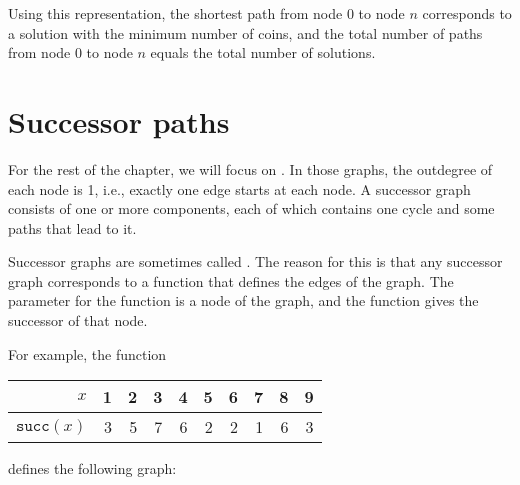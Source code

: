 Using this representation,
the shortest path from node 0 to node $n$
corresponds to a solution with the minimum number of coins,
and the total number of paths from node 0 to node $n$
equals the total number of solutions.

\section{Successor paths}


For the rest of the chapter,
we will focus on .
In those graphs,
the outdegree of each node is 1, i.e.,
exactly one edge starts at each node.
A successor graph consists of one or more
components, each of which contains
one cycle and some paths that lead to it.

Successor graphs are sometimes called
.
The reason for this is that any successor graph
corresponds to a function that defines
the edges of the graph.
The parameter for the function is a node of the graph,
and the function gives the successor of that node.

For example, the function
\begin{center}
\begin{tabular}{r|rrrrrrrrr}
$x$ & 1 & 2 & 3 & 4 & 5 & 6 & 7 & 8 & 9 \\
\hline
$\texttt{succ}(x)$ & 3 & 5 & 7 & 6 & 2 & 2 & 1 & 6 & 3 \\
\end{tabular}
\end{center}
defines the following graph:
\begin{center}
\end{center}

